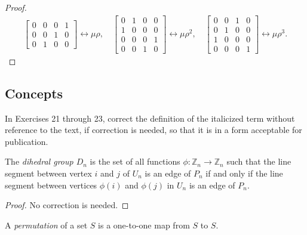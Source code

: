 \begin{proof}
\[\begin{split}
\begin{bmatrix}
                0 & 0 & 0 & 1 \\
                0 & 0 & 1 & 0 \\
                0 & 1 & 0 & 0
            \end{bmatrix}\leftrightarrow\mu\rho,\quad
            \begin{bmatrix}
                0 & 1 & 0 & 0 \\
                1 & 0 & 0 & 0 \\
                0 & 0 & 0 & 1 \\
                0 & 0 & 1 & 0
            \end{bmatrix}\leftrightarrow\mu\rho^{2},\quad
            \begin{bmatrix}
                0 & 0 & 1 & 0 \\
                0 & 1 & 0 & 0 \\
                1 & 0 & 0 & 0 \\
                0 & 0 & 0 & 1
            \end{bmatrix}\leftrightarrow\mu\rho^{3}.
        \end{split}
    \]
\end{proof}

\subsection*{Concepts}

In Exercises 21 through 23, correct the definition of the italicized term without reference to the text, if correction is needed, so that it is in a form acceptable for publication.

\begin{exercise}
    The \textit{dihedral group $D_{n}$} is the set of all functions $\phi: \mathbb{Z}_{n} \to \mathbb{Z}_{n}$ such that the line segment between vertex $i$ and $j$ of $U_{n}$ is an edge of $P_{n}$ if and only if the line segment between vertices $\phi(i)$ and $\phi(j)$ in $U_{n}$ is an edge of $P_{n}$.
\end{exercise}

\begin{proof}
    No correction is needed.
\end{proof}

\begin{exercise}
    A \textit{permutation} of a set $S$ is a one-to-one map from $S$ to $S$.
\end{exercise}

